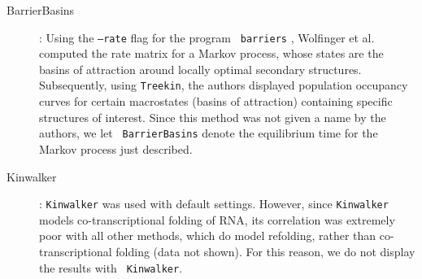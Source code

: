 \begin{description}
\item[BarrierBasins]: Using the {\tt --rate} flag for the program {\tt
barriers} \citep{flammHofacker}, Wolfinger et al.
\citep{wolfingerStadler:kinetics} computed the rate matrix for a Markov
process, whose states are the basins of attraction around locally
optimal secondary structures. Subsequently, using {\tt Treekin}, the
authors displayed population occupancy curves for certain macrostates
(basins of attraction) containing specific structures of interest.
Since this method was not given a name by the authors, we let {\tt
BarrierBasins} denote the equilibrium time for the Markov process just
described.

\item[Kinwalker]: {\tt Kinwalker} was used with default settings.
However, since {\tt Kinwalker} models co-transcriptional folding of
RNA, its correlation was extremely poor with all other methods, which
do model refolding, rather than co-transcriptional folding (data not
shown). For this reason, we do not display the results with {\tt
Kinwalker}.
\end{description}
